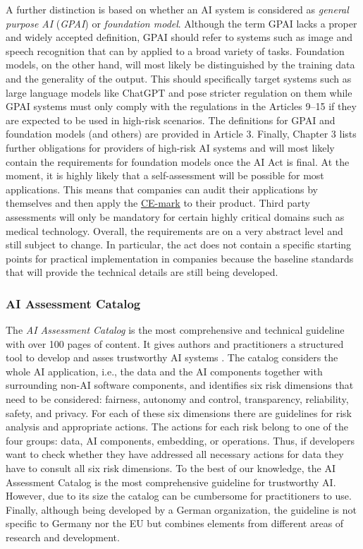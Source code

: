 A further distinction is based on whether an AI system is considered as \emph{general purpose AI} (\emph{GPAI}) or \emph{foundation model}. Although the term GPAI lacks a proper and widely accepted definition, GPAI should refer to systems such as image and speech recognition that  can by applied to a broad variety of tasks. Foundation models, on the other hand, will most likely be distinguished by the training data and the generality of the output. This should specifically target systems such as large language models like ChatGPT and pose stricter regulation on them while GPAI systems must only comply with the regulations in the Articles 9--15 if they are expected to be used in high-risk scenarios. The definitions for GPAI and foundation models (and others) are provided in Article 3. Finally, Chapter 3 lists further obligations for providers of high-risk AI systems and will most likely contain the requirements for foundation models once the AI Act is final.
At the moment, it is highly likely that a self-assessment will be possible for most applications. This means that companies can audit their applications by themselves and then apply the \href{https://en.wikipedia.org/wiki/CE_marking}{CE-mark} to their product. Third party assessments will only be mandatory for certain highly critical domains such as medical technology. 
Overall, the requirements are on a very abstract level and still subject to change. In particular, the act does not contain a specific starting points for practical implementation in companies because the baseline standards that will provide the technical details are still being developed.  

\subsubsection{\ac{AI} Assessment Catalog}
The \emph{\ac{AI} Assessment Catalog} is the most comprehensive and technical guideline with over 100 pages of content. It gives authors and practitioners a structured tool to develop and asses trustworthy \ac{AI} systems \citep{poretschkin2021_IAIS_Leitfaden}. The catalog considers the whole \ac{AI} application, i.e., the data and the AI components together with surrounding non-AI software components, and identifies six risk dimensions that need to be considered: fairness, autonomy and control, transparency, reliability, safety, and privacy. For each of these six dimensions there are guidelines for risk analysis and appropriate actions. The actions for each risk belong to one of the four groups: data, \ac{AI} components, embedding, or operations. Thus, if developers want to check whether they have addressed all necessary actions for data they have to consult all six risk dimensions. To the best of our knowledge, the AI Assessment Catalog is the most comprehensive guideline for trustworthy AI. However, due to its size the catalog can be cumbersome for practitioners to use. Finally, although being developed by a German organization, the guideline is not specific to Germany nor the \ac{EU} but combines elements from different areas of research and development.  

